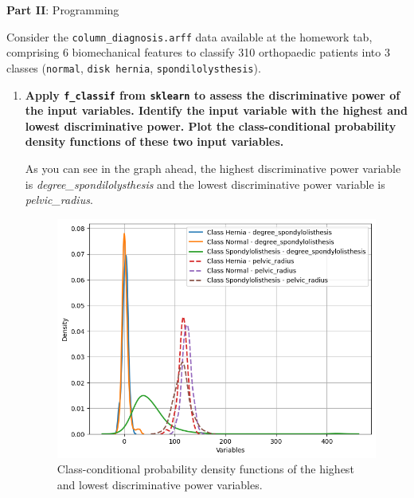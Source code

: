 \documentclass[12pt]{article}
\begin{document}
\vskip 0.5cm

\begin{center}
\large{\textbf{Part II}: Programming}\normalsize
\end{center}

\noindent Consider the \texttt{column\_diagnosis.arff} data available at the homework tab, comprising 6 biomechanical
features to classify 310 orthopaedic patients into 3 classes (\texttt{normal}, \texttt{disk hernia}, \texttt{spondilolysthesis}).

\begin{enumerate}[leftmargin=\labelsep]
    \item \textbf{Apply \texttt{f\_classif} from \texttt{sklearn} to assess the discriminative power of the input variables.
          Identify the input variable with the highest and lowest discriminative power.
          Plot the class-conditional probability density functions of these two input variables.}

          \vskip 0.3cm
          

          As you can see in the graph ahead, the highest discriminative power variable is \textit{degree\_spondilolysthesis} and
          the lowest discriminative power variable is \textit{pelvic\_radius}.

          \vskip -0.57cm

          \begin{figure}[H]
              \centering
              \includegraphics[width=15cm]{./assets/class_conditional_probability.png}
              \caption{Class-conditional probability density functions of the highest and lowest discriminative power variables.}
              \label{fig:PartII-ex1-plot}
          \end{figure}


\end{enumerate}
\end{document}
